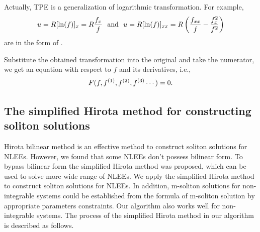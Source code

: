 Actually, TPE is a generalization of logarithmic transformation. For example,  
\begin{equation}
    u=R[\ln(f)]_x=R\frac{f_x}{f} \text{~~and~~} u=R[\ln(f)]_{xx}=R\left(\frac{f_{xx}}{f}-\frac{f_x^2}{f^2}\right)
\end{equation}
are in the form of . 

Substitute the obtained transformation into the original  and take the numerator, we get an equation with respect to $f$ and its derivatives, i.e.,
\begin{equation}
    F(f,f^{(1)},f^{(2)},f^{(3)}\cdots)=0. \label{feq}
\end{equation}

\subsection{The simplified Hirota method for constructing soliton solutions}
Hirota bilinear method is an effective method to construct soliton solutions for NLEEs. However, we found that some NLEEs don't possess bilinear form. To bypass bilinear form the simplified Hirota method was proposed, which can be used to solve more wide range of NLEEs. We apply the simplified Hirota method to construct soliton solutions for NLEEs. In addition, m-soliton solutions for non-integrable systems could be established from the formula of m-soliton solution by appropriate parameters constraints. Our algorithm also works well for non-integrable systems. The process of the simplified Hirota method in our algorithm is described as follows.

